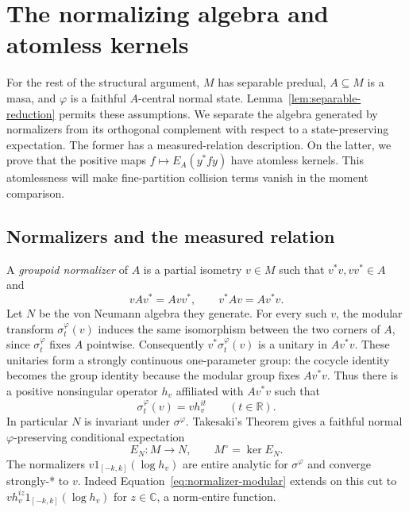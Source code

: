 \section{The normalizing algebra and atomless kernels}\label{sec:kernels}

For the rest of the structural argument, $M$ has separable predual,
$A\subseteq M$ is a masa, and $\varphi$ is a faithful $A$-central normal
state.  Lemma~\ref{lem:separable-reduction} permits these assumptions.
We separate the algebra generated by normalizers from its orthogonal
complement with respect to a state-preserving expectation.  The former
has a measured-relation description.  On the latter, we prove that the
positive maps $f\mapsto E_A(y^*fy)$ have atomless kernels.  This
atomlessness will make fine-partition collision terms vanish in the
moment comparison.

\subsection{Normalizers and the measured relation}

A \emph{groupoid normalizer} of $A$ is a partial isometry $v\in M$ such
that $v^*v,vv^*\in A$ and
\[
 vAv^*=Avv^*,\qquad v^*Av=Av^*v.
\]
Let $N$ be the von Neumann algebra they generate.  For every such $v$,
the modular transform $\sigma_t^\varphi(v)$ induces the same
isomorphism between the two corners of $A$, since $\sigma_t^\varphi$
fixes $A$ pointwise.  Consequently
$v^*\sigma_t^\varphi(v)$ is a unitary in $Av^*v$.
These unitaries form a strongly continuous one-parameter group:
the cocycle identity becomes the group identity because the modular
group fixes $Av^*v$.  Thus there is a positive nonsingular operator
$h_v$ affiliated with $Av^*v$ such that
\begin{equation}\label{eq:normalizer-modular}
 \sigma_t^\varphi(v)=v h_v^{it}\qquad(t\in\mathbb R).
\end{equation}
In particular $N$ is invariant under $\sigma^\varphi$.  Takesaki's
Theorem \cite{Tak72} gives a faithful normal $\varphi$-preserving
conditional expectation
\[
 E_N\colon M\longrightarrow N,
 \qquad M^\circ=\ker E_N.
\]
The normalizers
$v1_{[-k,k]}(\log h_v)$ are entire analytic for $\sigma^\varphi$ and
converge strongly-* to $v$.  Indeed Equation~\eqref{eq:normalizer-modular}
extends on this cut to $v h_v^{iz}1_{[-k,k]}(\log h_v)$ for
$z\in\mathbb C$, a norm-entire function.

